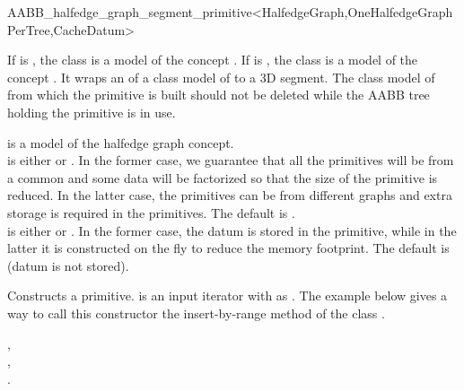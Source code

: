 \ccRefPageBegin

\begin{ccRefClass}{AABB_halfedge_graph_segment_primitive<HalfedgeGraph,OneHalfedgeGraphPerTree,CacheDatum>}

\ccDefinition
  
If  is , the class is a model of the concept .
If  is , the class is a model of the concept .
It wraps an  of a class model of  to a 3D segment.
The class model of  from which the primitive is built should not be deleted
while the AABB tree holding the primitive is in use.



\ccParameters
{} is a model of the halfedge graph concept.\\
 is either  or . In the former case, we guarantee that all the primitives will be from a common  and some data 
will be factorized so that the size of the primitive is reduced. In the latter case, the primitives can be from different graphs and extra storage is required in the primitives. The default is .\\
 is either  or . In the former case, the datum is stored in the primitive, while in the latter it is constructed on the fly to reduce
the memory footprint. The default is  (datum is not stored).


\ccTypes
{}
\ccGlue
{}
\ccGlue
{}

\ccCreation
{}

{Constructs a primitive.  is an input iterator with  as .
The example below gives a way to call this constructor the insert-by-range method of the class .}


\ccSeeAlso

,\\
,\\
.\\


\end{ccRefClass}

\ccRefPageEnd
